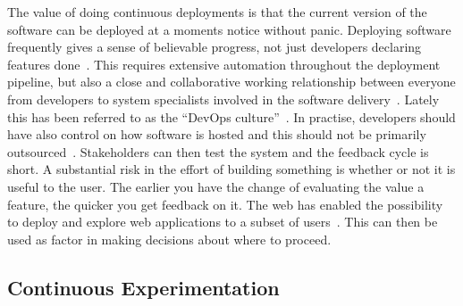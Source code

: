 \documentclass[english]{tktltiki2}
\begin{document}
The value of doing continuous deployments is that the current version of the software can be deployed at a moments notice without panic. Deploying software frequently gives a sense of believable progress, not just developers declaring features done~\cite{Fow13a}. This requires extensive automation throughout the deployment pipeline, but also a close and collaborative working relationship between everyone from developers to system specialists involved in the software delivery~\cite{Fow13a}. Lately this has been referred to as the “DevOps culture”~\cite{Fow13a}. In practise, developers should have also control on how software is hosted and this should not be primarily outsourced~\cite{HF11}. Stakeholders can then test the system and the feedback cycle is short. A substantial risk in the effort of building something is whether or not it is useful to the user. The earlier you have the change of evaluating the value a feature, the quicker you get feedback on it. The web has enabled the possibility to deploy and explore web applications to a subset of users~\cite{Fow06, Fow13a}. This can then be used as factor in making decisions about where to proceed.

\subsection{Continuous Experimentation}
\end{document}

